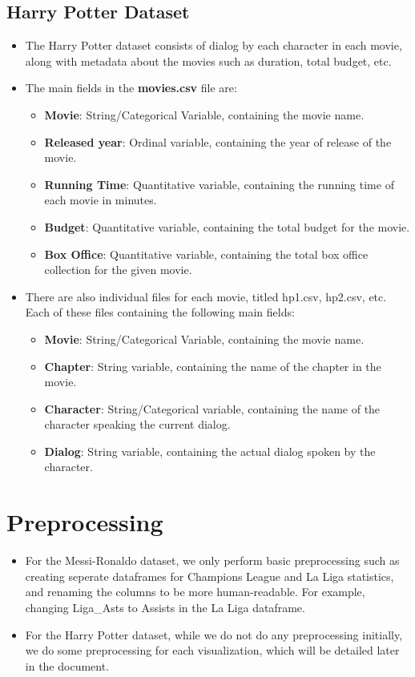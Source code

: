 \documentclass[a4paper]{article}
\begin{document}
\subsection{Harry Potter Dataset}
\begin{itemize}
    \item The Harry Potter dataset consists of dialog by each character in each movie, along with metadata about the movies such as duration, total budget, etc.
    \item The main fields in the \textbf{movies.csv} file are:
    \begin{itemize}
        \item \textbf{Movie}: String/Categorical Variable, containing the movie name.
        \item \textbf{Released year}: Ordinal variable, containing the year of release of the movie.
        \item \textbf{Running Time}: Quantitative variable, containing the running time of each movie in minutes.  
        \item \textbf{Budget}: Quantitative variable, containing the total budget for the movie.  
        \item \textbf{Box Office}: Quantitative variable, containing the total box office collection for the given movie.
    \end{itemize}
    \item There are also individual files for each movie, titled hp1.csv, hp2.csv, etc. Each of these files containing the following main fields:
    \begin{itemize}
        \item \textbf{Movie}: String/Categorical Variable, containing the movie name.
        \item \textbf{Chapter}: String variable, containing the name of the chapter in the movie.  
        \item \textbf{Character}: String/Categorical variable, containing the name of the character speaking the current dialog.  
        \item \textbf{Dialog}: String variable, containing the actual dialog spoken by the character.  
    \end{itemize}
\end{itemize}

\section{Preprocessing}
\begin{itemize}
    \item For the Messi-Ronaldo dataset, we only perform basic preprocessing such as creating seperate dataframes for Champions League and La Liga statistics, and renaming the columns to be more human-readable. For example, changing Liga\_Asts to Assists in the La Liga dataframe.
    \item For the Harry Potter dataset, while we do not do any preprocessing initially, we do some preprocessing for each visualization, which will be detailed later in the document.
\end{itemize}
\end{document}
